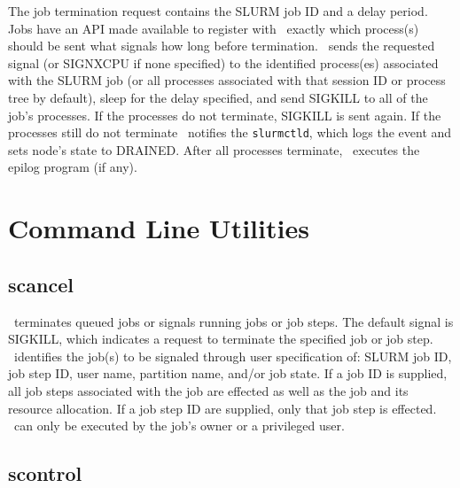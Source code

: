 The job termination request contains the SLURM job ID and a delay
period.  Jobs have an API made available to register with \slurmd\
exactly which process(s) should be sent what signals how long before
termination.  \slurmd\ sends the requested signal (or
SIGNXCPU if none specified) to the identified process(es) associated with
the SLURM job (or all processes associated with that session ID or process
tree by default), sleep for the delay specified, and send SIGKILL to all
of the job's processes.  If the processes do not terminate, SIGKILL is
sent again.  If the processes still do not terminate \slurmd\ notifies
the {\tt slurmctld}, which logs the event and sets node's state to DRAINED.
After all processes terminate, \slurmd\ executes the epilog program
(if any).

\section{Command Line Utilities}

\subsection{scancel}

\scancel\ terminates queued jobs or signals running jobs or job steps. 
The default signal is SIGKILL, which indicates a request to terminate 
the specified job or job step. 
\scancel\ identifies the job(s) to be signaled
through user specification of: SLURM job ID, job step ID, user name, 
partition name, and/or job state. 
If a job ID is supplied, all job steps associated with the job are
effected as well as the job and its resource allocation. 
If a job step ID are supplied, only that job step is effected.
\scancel\ can only be executed by the job's owner or a privileged user.

\subsection{scontrol}

